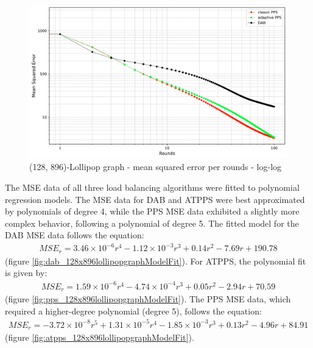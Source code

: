 \begin{figure}[]
    \centering
    \includegraphics[width=\linewidth]{figures/Simulation_outcomes/LollipopGraph/128_896/DAB_vs_PPS_LG_r100_n1024_averaged_loglog.png}
    \caption{(128, 896)-Lollipop graph - mean squared error per rounds - log-log}
    \label{fig:128_896lollipopgraphMSEperRoundLogLog}
\end{figure}

The MSE data of all three load balancing algorithms were fitted to polynomial regression models. The MSE data for DAB and ATPPS were best approximated by polynomials of degree 4, while the PPS MSE data exhibited a slightly more complex behavior, following a polynomial of degree 5. The fitted model for the DAB MSE data follows the equation: 
\begin{align}
    MSE_r=3.46\times 10^{-6}r^{4}-1.12\times 10^{-3}r^{3}+0.14r^{2}-7.69r+190.78    
\end{align}
(figure \ref{fig:dab_128x896lollipopgraphModelFit}). For ATPPS, the polynomial fit is given by:
\begin{align}
    MSE_r=1.59\times 10^{-6}r^{4}-4.74\times 10^{-4}r^{3}+0.05r^{2}-2.94r+70.59    
\end{align}
(figure \ref{fig:pps_128x896lollipopgraphModelFit}). The PPS MSE data, which required a higher-degree polynomial (degree 5), follows the equation:
\begin{align}
    MSE_r=-3.72\times10^{-8}r^{5}+1.31\times 10^{-5}r^{4}-1.85\times 10^{-3}r^{3}+0.13r^{2}-4.96r+84.91    
\end{align}
(figure \ref{fig:atpps_128x896lollipopgraphModelFit}).

